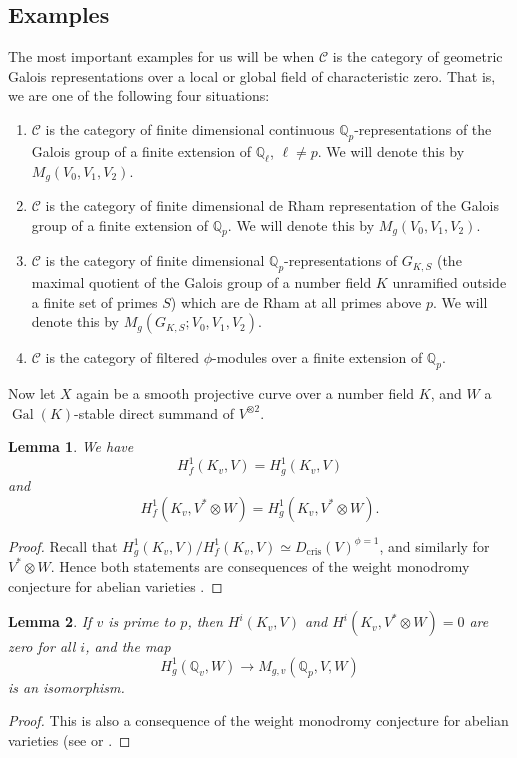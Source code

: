\documentclass[11pt]{amsart}
\def\Q{\mathbb Q}
\theoremstyle{plain}
\newtheorem{lemma}{Lemma}
\theoremstyle{definition}
\DeclareMathOperator{\Gal}{Gal}
\newcommand{\cris}{\mathrm{cris}}
\begin{document}
\subsection{Examples}
The most important examples for us will be when $\mathcal{C}$ is the category of geometric Galois representations over a local or global field of characteristic zero. That is, we are one of the following four situations:
\begin{enumerate}
\item $\mathcal{C}$ is the category of finite dimensional continuous $\Q _p$-representations of the Galois group of a finite extension of $\Q _{\ell }$, $\ell \neq p$. We will denote this by $M_g (V_0 ,V_1 ,V_2 )$.
\item $\mathcal{C}$ is the category of finite dimensional de Rham representation of the Galois group of a finite extension of $\Q _p $. We will denote this by $M_g (V_0 ,V_1 ,V_2 )$.
\item $\mathcal{C}$ is the category of finite dimensional $\Q _p $-representations of $G_{K,S}$ (the maximal quotient of the Galois group of a number field $K$ unramified outside a finite set of primes $S$) which are de Rham at all primes above $p$. We will denote this by $M_g (G_{K,S} ;V_0 ,V_1 ,V_2 )$.
\item $\mathcal{C}$ is the category of filtered $\phi $-modules over a finite extension of $\Q _p $. 
\end{enumerate}
Now let $X$ again be a smooth projective curve over a number field $K$, and $W$ a $\Gal (K)$-stable direct summand of $V^{\otimes 2}$.
\begin{lemma}\label{lemma:WM}
We have 
\[
H^1 _f (K_v ,V)=H^1 _g (K_v ,V)
\]
and 
\[
H^1 _f (K_v ,V^* \otimes W)=H^1 _g (K_v ,V^* \otimes W).
\]
\end{lemma}
\begin{proof}
Recall that $H^1 _g (K_v ,V)/H^1 _f (K_v ,V)\simeq D_{\cris }(V) ^{\phi =1}$, and similarly for $V^* \otimes W$. Hence both statements are consequences of the weight monodromy conjecture for abelian varieties \cite{nekovar}.
\end{proof}
\begin{lemma}\label{lemma:zero}
If $v$ is prime to $p$, then $H^i (K_v ,V)$ and $H^i (K_v ,V^* \otimes W)=0$ are zero for all $i$, and the map
\[
H^1 _g (\Q _v ,W)\to M_{g,v}(\Q _p ,V,W)
\]
is an isomorphism.
\end{lemma}
\begin{proof}
This is also a consequence of the weight monodromy conjecture for abelian varieties (see \cite{nekovar} or \cite[Lemma 3.4]{QC2}.
\end{proof}
\end{document}
